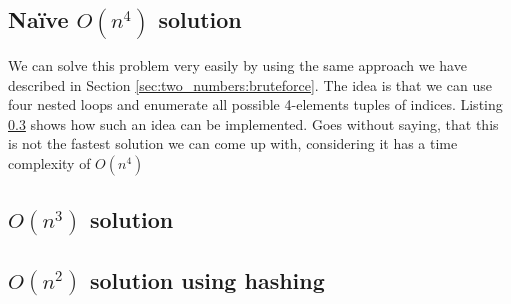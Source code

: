\subsection{Na\"ive $O(n^4)$ solution}
We can solve this problem very easily by using the same approach we have described in Section \ref{sec:two_numbers:bruteforce}.
The idea is that we can use four nested loops and enumerate all possible 4-elements tuples of indices. Listing \ref{} shows how such an idea can be implemented.
Goes without saying, that this is not the fastest solution we can come up with, considering it has a time complexity of $O(n^4)$




\subsection{$O(n^3)$ solution}



\subsection{$O(n^2)$ solution using hashing}





